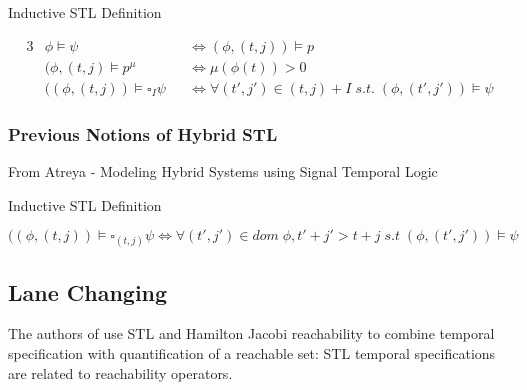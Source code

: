 \documentclass{article}
\theoremstyle{definition}
\begin{document}
\begin{center}
    Inductive STL Definition
\end{center}
\begin{alignat*}{3}
            &\phi \models \psi &&\Leftrightarrow (\phi, (t,j)) \models p \\
            &(\phi, (t,j) \models p^\mu \quad &&\Leftrightarrow \mu(\phi(t))
> 0\\
            &((\phi,(t,j)) \models \square_{I} \psi &&\Leftrightarrow \forall (t',j') \in (t,j)+I\;s.t.\;(\phi, (t',j')) \models \psi
\end{alignat*}

\subsubsection{Previous Notions of Hybrid STL}
From Atreya - Modeling Hybrid Systems using Signal Temporal Logic
\begin{center}
    Inductive STL Definition
\end{center}

\begin{equation}
            ((\phi,(t,j)) \models \square_{(t,j)} \psi \Leftrightarrow \forall (t',j') \in dom\;\phi, t'+j' > t + j\;s.t\;(\phi, (t',j')) \models \psi
\end{equation}




\clearpage
\appendix
\subsection{Lane Changing}
The authors of \cite{chen_signal_nodate} use STL and Hamilton Jacobi reachability to combine temporal specification with quantification of a reachable set: STL temporal specifications are related to reachability operators.
\end{document}

